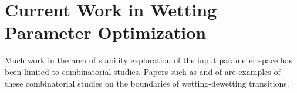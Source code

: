 \documentclass{article}
\begin{document}
\section{Current Work in Wetting Parameter Optimization}
Much work in the area of stability exploration of the input parameter space has been limited to combinatorial studies. Papers such as \textcite{meredith2000combinatorial} and of \textcite{ashley2005wetting} are examples of these combinatorial studies on the boundaries of wetting-dewetting transitions. 


\printbibliography
\end{document}
